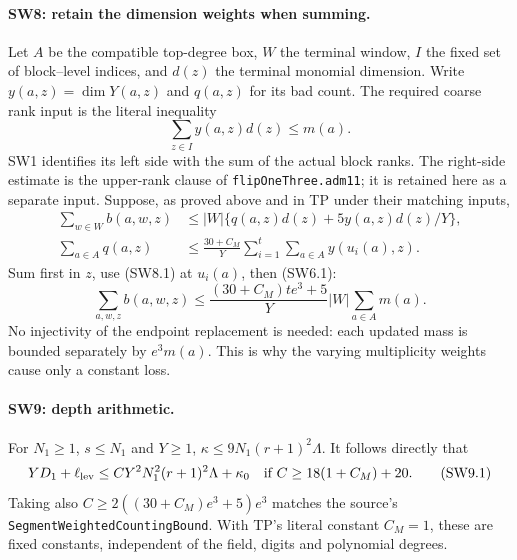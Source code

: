\documentclass[11pt,a4paper]{article}
\numberwithin{equation}{section}
\theoremstyle{remark}\newtheorem{remark}[theorem]{Remark}
\begin{document}
\paragraph{SW8: retain the dimension weights when summing.}
Let $A$ be the compatible top-degree box, $W$ the terminal window,
$I$ the fixed set of block--level indices, and $d(z)$ the terminal
monomial dimension. Write $y(a,z)=\dim Y(a,z)$ and $q(a,z)$ for its
bad count. The required coarse rank input is the literal inequality
\[
 \sum_{z\in I}y(a,z)d(z)\le m(a).
 \tag{SW8.1}
\]
SW1 identifies its left side with the sum of the actual block ranks.
The right-side estimate is the upper-rank clause of
\texttt{flipOneThree.adm11}; it is retained here as a separate input.
Suppose, as proved above and in TP under their matching inputs,
\[
 \begin{aligned}
 \sum_{w\in W}b(a,w,z)&\le |W|
       \{q(a,z)d(z)+5y(a,z)d(z)/Y\},\\
 \sum_{a\in A}q(a,z)&\le\frac{30+C_M}{Y}
       \sum_{i=1}^t\sum_{a\in A}y(u_i(a),z).
 \end{aligned}
 \tag{SW8.2}
\]
Sum first in $z$, use (SW8.1) at $u_i(a)$, then (SW6.1):
\[
 \boxed{\quad
 \sum_{a,w,z}b(a,w,z)
 \le \frac{(30+C_M)t e^3+5}{Y}
                |W|\sum_{a\in A}m(a).\quad}
 \tag{SW8.3}
\]
No injectivity of the endpoint replacement is needed: each updated mass
is bounded separately by $e^3m(a)$. This is why the varying multiplicity
weights cause only a constant loss.

\paragraph{SW9: depth arithmetic.}
For $N_1\ge1$, $s\le N_1$ and $Y\ge1$,
$\kappa\le9N_1(r+1)^2\Lambda$.
It follows directly that
\[
 YD_1+\ell_{\rm lev}
 \le C Y^2N_1^2(r+1)^2\Lambda+\kappa_0
 \quad\text{if }C\ge18(1+C_M)+20.
 \tag{SW9.1}
\]
Taking also
$C\ge2((30+C_M)e^3+5)e^3$
matches the source's \texttt{SegmentWeightedCountingBound}.
With TP's literal constant $C_M=1$, these are fixed constants, independent
of the field, digits and polynomial degrees.
\end{document}
